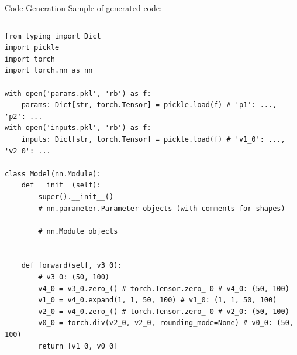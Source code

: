 \documentclass{beamer}
\begin{document}
\begin{frame}[fragile]{Code Generation}
    Sample of generated code:
    \begin{columns}
        \begin{verbatim}
from typing import Dict
import pickle
import torch
import torch.nn as nn

with open('params.pkl', 'rb') as f:
    params: Dict[str, torch.Tensor] = pickle.load(f) # 'p1': ..., 'p2': ...
with open('inputs.pkl', 'rb') as f:
    inputs: Dict[str, torch.Tensor] = pickle.load(f) # 'v1_0': ..., 'v2_0': ...

class Model(nn.Module):
    def __init__(self):
        super().__init__()
        # nn.parameter.Parameter objects (with comments for shapes)

        # nn.Module objects


    def forward(self, v3_0):
        # v3_0: (50, 100)
        v4_0 = v3_0.zero_() # torch.Tensor.zero_-0 # v4_0: (50, 100)
        v1_0 = v4_0.expand(1, 1, 50, 100) # v1_0: (1, 1, 50, 100)
        v2_0 = v4_0.zero_() # torch.Tensor.zero_-0 # v2_0: (50, 100)
        v0_0 = torch.div(v2_0, v2_0, rounding_mode=None) # v0_0: (50, 100)
        return [v1_0, v0_0]
    \end{verbatim}
    \end{columns}
\end{frame}
\end{document}
